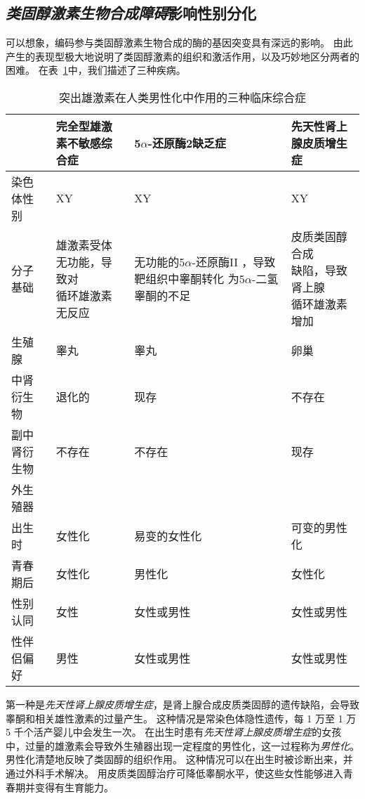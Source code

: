 \subsection{\textit{类固醇激素生物合成障碍}影响性别分化}

可以想象，编码参与类固醇激素生物合成的酶的基因突变具有深远的影响。
由此产生的表现型极大地说明了类固醇激素的组织和激活作用，以及巧妙地区分两者的困难。
在表~\ref{tab:51_1}中，我们描述了三种疾病。


\begin{table}[htbp]
	\caption{突出雄激素在人类男性化中作用的三种临床综合症} \label{tab:51_1} \centering
	\begin{tabular}{llll}
		\toprule
		 & 完全型雄激素不敏感综合症 & 5$\alpha$-还原酶2缺乏症 & 先天性肾上腺皮质增生症\\
		\midrule
		染色体性别 & XY & XY & XY \\
		分子基础 & \makecell[l]{雄激素受体\\无功能，导致对\\循环雄激素无反应} & \makecell[l]{无功能的5$\alpha$-还原酶II\\，导致靶组织中睾酮转化\\为5$\alpha$-二氢睾酮的不足} & \makecell[l]{皮质类固醇合成\\缺陷，导致肾上腺\\循环雄激素增加} \\
		生殖腺 & 睾丸 & 睾丸 & 卵巢 \\
		中肾衍生物 & 退化的 & 现存 & 不存在 \\
		副中肾衍生物 & 不存在 & 不存在 & 现存 \\
		外生殖器 &  &  &  \\
		出生时 & 女性化 & 易变的女性化 & 可变的男性化 \\
		青春期后 & 女性化 & 男性化 & 女性化 \\
		性别认同 & 女性 & 女性或男性 & 女性或男性 \\
		性伴侣偏好 & 男性 & 女性或男性 & 女性或男性 \\
		\bottomrule
	\end{tabular}
\end{table}


第一种是\textit{先天性肾上腺皮质增生症}，是肾上腺合成皮质类固醇的遗传缺陷，会导致睾酮和相关雄性激素的过量产生。
这种情况是常染色体隐性遗传，每 1 万至 1 万 5 千个活产婴儿中会发生一次。
在出生时患有\textit{先天性肾上腺皮质增生症}的女孩中，过量的雄激素会导致外生殖器出现一定程度的男性化，这一过程称为\textit{男性化}。
男性化清楚地反映了类固醇的组织作用。
这种情况可以在出生时被诊断出来，并通过外科手术解决。
用皮质类固醇治疗可降低睾酮水平，使这些女性能够进入青春期并变得有生育能力。


